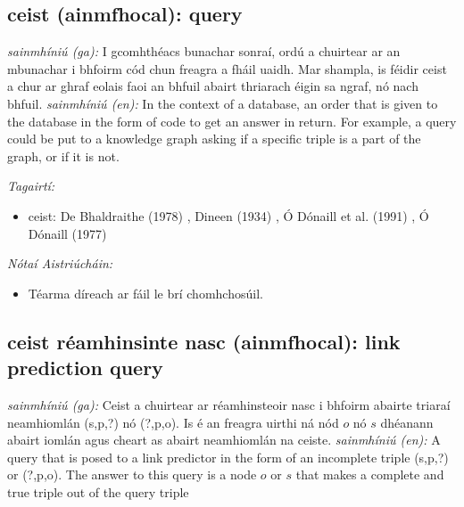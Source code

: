 \documentclass{article}
\begin{document}
\subsection*{ceist (ainmfhocal): query} 
 \noindent \textit{sainmhíniú (ga):} I gcomhthéacs bunachar sonraí, ordú a chuirtear ar an mbunachar i bhfoirm cód chun freagra a fháil uaidh. Mar shampla, is féidir ceist a chur ar ghraf eolais faoi an bhfuil abairt thriarach éigin sa ngraf, nó nach bhfuil.
\newline\newline
 \noindent \textit{sainmhíniú (en):} In the context of a database, an order that is given to the database in the form of code to get an answer in return. For example, a query could be put to a knowledge graph asking if a specific triple is a part of the graph, or if it is not.
\newline

 \noindent \textit{Tagairtí:}
\begin{itemize}
	\item ceist: De Bhaldraithe (1978) \cite{de-bhaldraithe}, Dineen (1934) \cite{dineen}, Ó Dónaill et al. (1991) \cite{focloir-beag}, Ó Dónaill (1977) \cite{odonaill}
\end{itemize}

 \noindent \textit{Nótaí Aistriúcháin:}
\begin{itemize}
	\item Téarma díreach ar fáil le brí chomhchosúil.
\end{itemize}


\subsection*{ceist réamhinsinte nasc (ainmfhocal): link prediction query} 
 \noindent \textit{sainmhíniú (ga):} Ceist a chuirtear ar réamhinsteoir nasc i bhfoirm abairte triaraí neamhiomlán (s,p,?) nó (?,p,o). Is é an freagra uirthi ná nód $o$ nó $s$ dhéanann abairt iomlán agus cheart as abairt neamhiomlán na ceiste.
\newline\newline
 \noindent \textit{sainmhíniú (en):} A query that is posed to a link predictor in the form of an incomplete triple (s,p,?) or (?,p,o). The answer to this query is a node $o$ or $s$ that makes a complete and true triple out of the query triple
\newline
\end{document}
